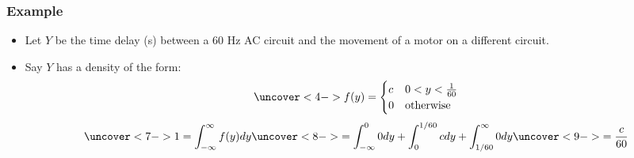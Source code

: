 \documentclass[handout]{beamer}\usepackage{graphicx, color}
\providecommand{\nv}{{}^{-1}}
\numberwithin{equation}{section}
\begin{document}


\begin{frame}
\frametitle{Example} \small
\begin{itemize}
\pause \item Let $Y$ be the time delay (s) between a 60 Hz AC circuit and the movement of a motor on a different circuit.
\pause \item Say $Y$ has a density of the form:
\begin{align*}
\uncover<4->{f(y) = \begin{cases}
c & 0 < y < \frac{1}{60}\\
0 & \text{otherwise}
\end{cases}}
\end{align*}
\begin{align*}
\uncover<7->{1 = \int_{- \infty}^\infty f(y) dy}  \uncover<8->{= \int_{- \infty}^0 0 dy  + \int_0^{1/60} c dy + \int_{1/60}^\infty 0 dy } \uncover<9->{= \frac{c}{60}}
\end{align*}
\end{itemize}
\end{frame}
\end{document}
